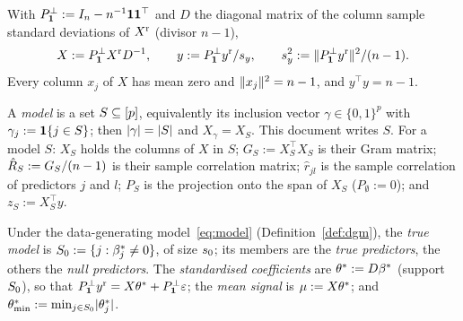 \begin{definition}[Standardisation]\label{def:standardise}
With $P^\perp_{\mathbf{1}}:=I_n-n^{-1}\mathbf{1}\mathbf{1}^\top$ and $D$ the diagonal matrix of the column sample standard deviations of
$X^{\mathrm r}$ (divisor $n-1$),
\begin{equation}\label{eq:standardise}
  X:=P^\perp_{\mathbf{1}}X^{\mathrm r} D^{-1},\qquad y:=P^\perp_{\mathbf{1}}y^{\mathrm r}/s_y,\qquad s_y^2:=\lVert P^\perp_{\mathbf{1}}y^{\mathrm r}\rVert^2/(n-1).
\end{equation}
Every column $x_j$ of $X$ has mean zero and $\lVert x_j\rVert^2=n-1$, and $y^\top y=n-1$.
\end{definition}

\begin{definition}[Models]\label{def:models}
A \emph{model} is a set $S\subseteq[p]$, equivalently its inclusion vector $\gamma\in\{0,1\}^p$ with
$\gamma_j:=\mathbf{1}\{j\in S\}$; then $\lvert \gamma\rvert=\lvert S\rvert$ and $X_\gamma=X_S$. This document writes $S$. For a model $S$:
$X_S$ holds the columns of $X$ in $S$; $G_S:=X_S^\top X_S$ is their Gram matrix; $\hat R_S:=G_S/(n-1)$ is their sample
correlation matrix; $\hat r_{jl}$ is the sample correlation of predictors $j$ and $l$; $P_S$ is the projection onto the
span of $X_S$ ($P_\emptyset:=0$); and $z_S:=X_S^\top y$.
\end{definition}

\begin{definition}\label{def:truth}
Under the data-generating model~\eqref{eq:model} (Definition~\ref{def:dgm}), the \emph{true model} is
$S_0:=\{j:\beta^*_j\neq0\}$, of size $s_0$; its members are the \emph{true predictors}, the others the \emph{null
predictors}. The \emph{standardised coefficients} are $\theta^*:=D\beta^*$ (support $S_0$), so that
$P^\perp_{\mathbf{1}}y^{\mathrm r}=X\theta^*+P^\perp_{\mathbf{1}}\varepsilon$; the \emph{mean signal} is $\mu:=X\theta^*$; and
$\theta^*_{\min}:=\min_{j\in S_0}\lvert \theta^*_j\rvert$.
\end{definition}

